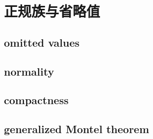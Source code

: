 \section{正规族与省略值}
\label{b3:sec:1403}


\subsection{omitted values}
\label{b3:subsec:140301}

\subsection{normality}
\label{b3:subsec:140302}

\subsection{compactness}
\label{b3:subsec:140303}

\subsection{generalized Montel theorem}
\label{b3:subsec:140304}


